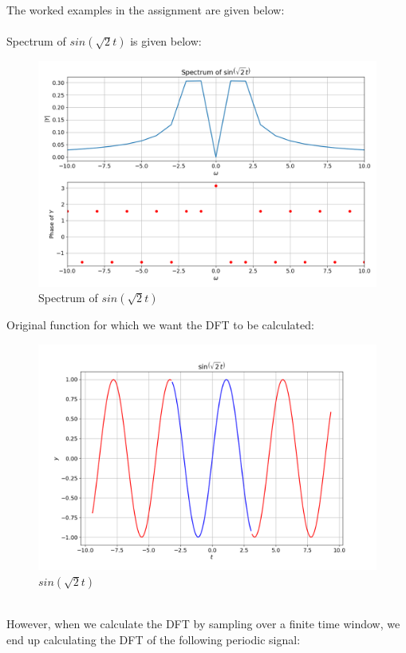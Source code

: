 \documentclass[11pt, a4paper]{article}
\begin{document}
The worked examples in the assignment are given below: \\ \\
\noindent
Spectrum of $sin(\sqrt{2}t)$ is given below: \newline
\begin{figure}[!tbh]
\centering
\includegraphics[scale=0.4]{plots/sin(sqrt(2).png}
\caption{Spectrum of $sin(\sqrt{2}t)$}
\label{fig:1}
\end{figure}
\newpage
Original function for which we want the DFT to be calculated:
\begin{figure}[!tbh]
\centering
\includegraphics[scale=0.4]{plots/sin(sqrt(2)_plot.png}
\caption{$sin(\sqrt{2}t)$}
\label{fig:2}
\end{figure}
\noindent
\\
However, when we calculate the DFT by sampling over a finite time
window, we end up calculating the DFT of the following periodic signal:
\end{document}
